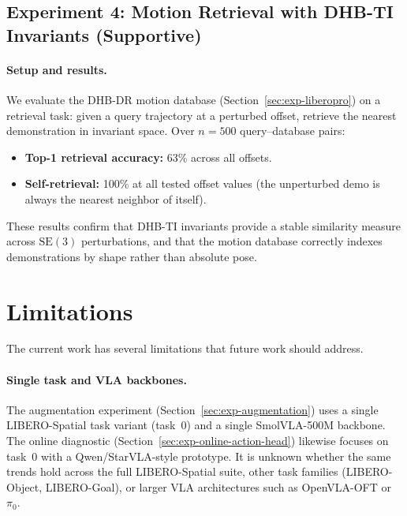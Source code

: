 \documentclass[11pt]{article}
\begin{document}
\subsection{Experiment 4: Motion Retrieval with DHB-TI Invariants (Supportive)}\label{sec:exp-retrieval}
\paragraph{Setup and results.}
We evaluate the DHB-DR motion database (Section~\ref{sec:exp-liberopro}) on a retrieval task: given a query trajectory at a perturbed offset, retrieve the nearest demonstration in invariant space. Over $n=500$ query--database pairs:
\begin{itemize}
  \item \textbf{Top-1 retrieval accuracy:} 63\% across all offsets.
  \item \textbf{Self-retrieval:} 100\% at all tested offset values (the unperturbed demo is always the nearest neighbor of itself).
\end{itemize}
These results confirm that DHB-TI invariants provide a stable similarity measure across $\mathrm{SE}(3)$ perturbations, and that the motion database correctly indexes demonstrations by shape rather than absolute pose.

\section{Limitations}\label{sec:limitations}
The current work has several limitations that future work should address.

\paragraph{Single task and VLA backbones.}
The augmentation experiment (Section~\ref{sec:exp-augmentation}) uses a single LIBERO-Spatial task variant (task~0) and a single SmolVLA-500M backbone. The online diagnostic (Section~\ref{sec:exp-online-action-head}) likewise focuses on task~0 with a Qwen/StarVLA-style prototype. It is unknown whether the same trends hold across the full LIBERO-Spatial suite, other task families (LIBERO-Object, LIBERO-Goal), or larger VLA architectures such as OpenVLA-OFT or $\pi_0$.
\end{document}
